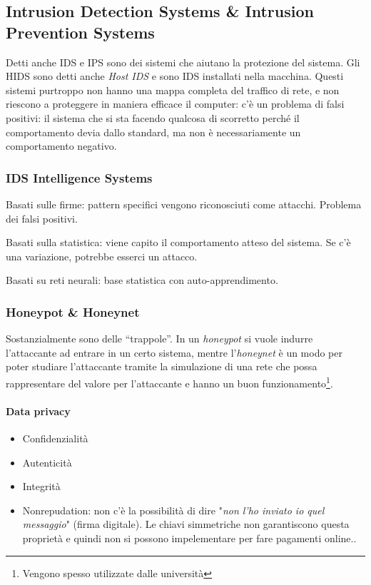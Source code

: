 \subsection{Intrusion Detection Systems \& Intrusion Prevention Systems}

Detti anche IDS e IPS sono dei sistemi che aiutano la protezione del sistema.
Gli HIDS sono detti anche \textit{Host IDS} e sono IDS installati nella
macchina. Questi sistemi purtroppo non hanno una mappa completa del traffico di
rete, e non riescono a proteggere in maniera efficace il computer: c'è un
problema di falsi positivi: il sistema che si sta facendo qualcosa di scorretto
perché il comportamento devia dallo standard, ma non è necessariamente un
comportamento negativo.

\subsubsection{IDS Intelligence Systems}

Basati sulle firme: pattern specifici vengono riconosciuti come attacchi.
Problema dei falsi positivi.

Basati sulla statistica: viene capito il comportamento atteso del sistema. Se
c'è una variazione, potrebbe esserci un attacco.

Basati su reti neurali: base statistica con auto-apprendimento.

\subsubsection{Honeypot \& Honeynet}

Sostanzialmente sono delle ``trappole''. In un \textit{honeypot} si vuole
indurre l'attaccante ad entrare in un certo sistema, mentre l'\textit{honeynet}
è un modo per poter studiare l'attaccante tramite la simulazione di una rete che
possa rappresentare del valore per l'attaccante e hanno un buon
funzionamento\footnote{Vengono spesso utilizzate dalle università}.

\paragraph{Data privacy}

\begin{itemize}
\item Confidenzialità
\item Autenticità
\item Integrità
\item Nonrepudation: non c'è la possibilità di dire "\textit{non l'ho inviato io
quel messaggio}" (firma digitale). Le chiavi simmetriche non garantiscono questa
proprietà e quindi non si possono impelementare per fare pagamenti online..
\end{itemize}

